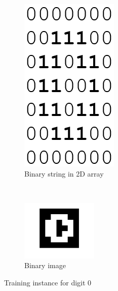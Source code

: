 \documentclass[paper=letter, fontsize=10pt]{scrartcl} %
\numberwithin{equation}{section} %
\numberwithin{figure}{section} %
\numberwithin{table}{section} %
\begin{document}

\begin{figure}
        \centering
        \begin{subfigure}[b]{0.4\textwidth}
\centering
                \includegraphics[scale=0.25]{digit0raw.png}
                \caption{Binary string in 2D array}
                \label{fig:zero2d}
        \end{subfigure}%
        ~ %
        \begin{subfigure}[b]{0.4\textwidth}
\centering
                \includegraphics[trim=1cm 1cm 1cm 1cm, width=0.4\textwidth]{digit0.png}
                \caption{Binary image}
                \label{fig:zeroim}
        \end{subfigure}
\caption{Training instance for digit 0}
\end{figure}
\end{document}
